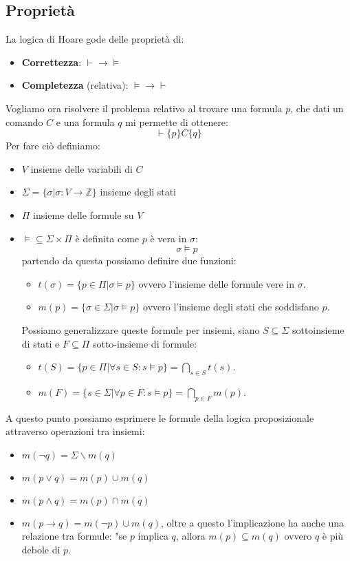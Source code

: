 \subsection{Proprietà}
La logica di Hoare gode delle proprietà di:
\begin{itemize}
    \item \textbf{Correttezza}: $\vdash \to \models$
    \item \textbf{Completezza} (relativa): $\models \to \vdash$
\end{itemize}
Vogliamo ora risolvere il problema relativo al trovare una formula $p$, che dati un comando $C$ e una formula $q$ mi permette di ottenere: $$\vdash \{p\} C \{q\}$$ Per fare ciò definiamo:
\begin{itemize}
    \item $V$ insieme delle variabili di $C$
    \item $\Sigma = \{\sigma | \sigma: V \to \mathbb{Z} \}$ insieme degli stati
    \item $\Pi$ insieme delle formule su $V$
    \item $\models \subseteq \Sigma \times \Pi$ è definita come $p$ è vera in $\sigma$:
    \begin{equation}
        \sigma \models p
    \end{equation}
    partendo da questa possiamo definire due funzioni:
    \begin{itemize}
        \item $t(\sigma) = \{p \in \Pi | \sigma \models p \}$ ovvero l'insieme delle formule vere in $\sigma$.
        \item $m(p) = \{\sigma \in \Sigma | \sigma \models p \}$ ovvero l'insieme degli stati che soddisfano $p$.
    \end{itemize}
    Possiamo generalizzare queste formule per insiemi, siano $S \subseteq \Sigma$ sottoinsieme di stati e $F \subseteq \Pi$ sotto-insieme di formule:
        \begin{itemize}
        \item $t(S) = \{p \in \Pi | \forall s \in S: s \models p \} = \bigcap_{s \in S} t(s)$.
        \item $m(F) = \{s \in \Sigma | \forall p \in F: s \models p\} = \bigcap_{p \in F} m(p)$.
    \end{itemize}
\end{itemize}
A questo punto possiamo esprimere le formule della logica proposizionale attraverso operazioni tra insiemi:
\begin{itemize}
    \item $m(\lnot q) = \Sigma \backslash m(q)$
    \item $m(p \lor q) = m(p) \cup m(q)$
    \item $m(p \land q) = m(p) \cap m(q)$
    \item $m(p \to q) = m(\lnot p) \cup m(q)$, oltre a questo l'implicazione ha anche una relazione tra formule: "se $p$ implica $q$, allora $m(p) \subseteq m(q)$ ovvero $q$ è più debole di $p$.
\end{itemize}
